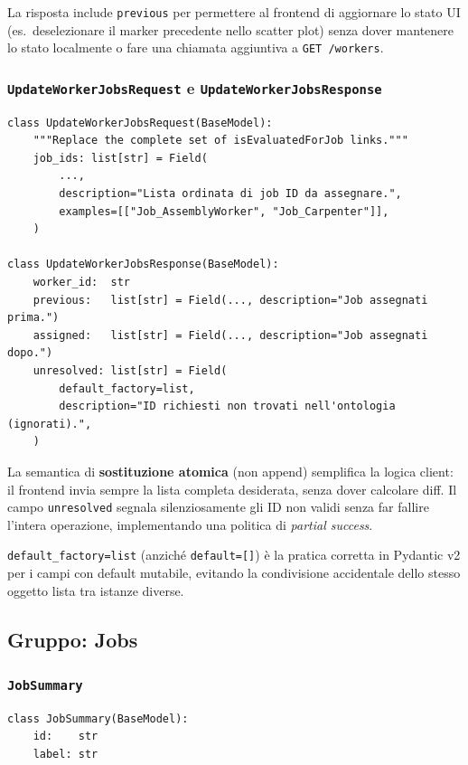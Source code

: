 \documentclass[a4paper,12pt]{article}
\begin{document}
\noindent La risposta include \texttt{previous} per permettere al frontend di
aggiornare lo stato UI (es.\ deselezionare il marker precedente nello
scatter plot) senza dover mantenere lo stato localmente o fare una
chiamata aggiuntiva a \texttt{GET /workers}.

\subsubsection{\texttt{UpdateWorkerJobsRequest} e \texttt{UpdateWorkerJobsResponse}}

\begin{lstlisting}[caption={Aggiornamento dei job assegnati a un lavoratore.}]
class UpdateWorkerJobsRequest(BaseModel):
    """Replace the complete set of isEvaluatedForJob links."""
    job_ids: list[str] = Field(
        ...,
        description="Lista ordinata di job ID da assegnare.",
        examples=[["Job_AssemblyWorker", "Job_Carpenter"]],
    )

class UpdateWorkerJobsResponse(BaseModel):
    worker_id:  str
    previous:   list[str] = Field(..., description="Job assegnati prima.")
    assigned:   list[str] = Field(..., description="Job assegnati dopo.")
    unresolved: list[str] = Field(
        default_factory=list,
        description="ID richiesti non trovati nell'ontologia (ignorati).",
    )
\end{lstlisting}

\noindent La semantica di \textbf{sostituzione atomica} (non append) semplifica
la logica client: il frontend invia sempre la lista completa desiderata,
senza dover calcolare diff. Il campo \texttt{unresolved} segnala
silenziosamente gli ID non validi senza far fallire l'intera operazione,
implementando una politica di \textit{partial success}.

\texttt{default\_factory=list} (anzich\'{e} \texttt{default=[]}) \`{e}
la pratica corretta in Pydantic v2 per i campi con default mutabile,
evitando la condivisione accidentale dello stesso oggetto lista tra
istanze diverse.

\subsection{Gruppo: Jobs}

\subsubsection{\texttt{JobSummary}}

\begin{lstlisting}[caption={\texttt{JobSummary} --- elemento di lista job.}]
class JobSummary(BaseModel):
    id:    str
    label: str
\end{lstlisting}
\end{document}
